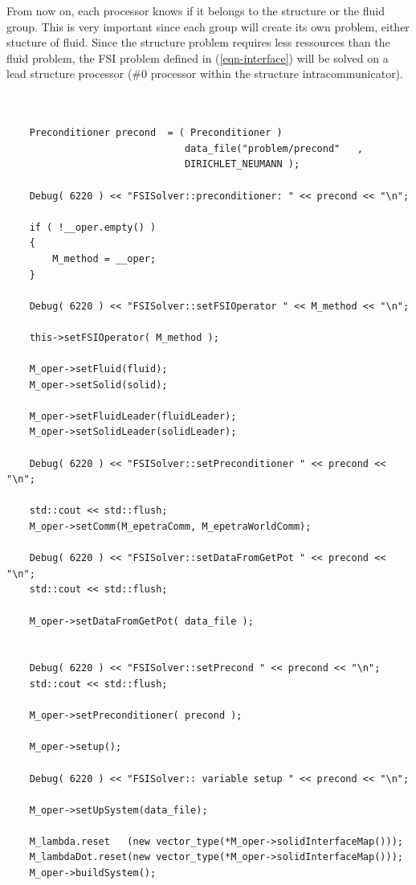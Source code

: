 From now on, each processor knows if it belongs to the structure or the fluid group. This is
very important since each group will create its own problem, either stucture of fluid.
Since the structure problem requires less ressources than the fluid problem, the FSI problem defined in (\ref{eqn-interface})
will be solved on a lead structure processor (\#0 processor within the structure intracommunicator).

\begin{verbatim}


    Preconditioner precond  = ( Preconditioner )
                               data_file("problem/precond"   ,
                               DIRICHLET_NEUMANN );

    Debug( 6220 ) << "FSISolver::preconditioner: " << precond << "\n";

    if ( !__oper.empty() )
    {
        M_method = __oper;
    }

    Debug( 6220 ) << "FSISolver::setFSIOperator " << M_method << "\n";

    this->setFSIOperator( M_method );

    M_oper->setFluid(fluid);
    M_oper->setSolid(solid);

    M_oper->setFluidLeader(fluidLeader);
    M_oper->setSolidLeader(solidLeader);

    Debug( 6220 ) << "FSISolver::setPreconditioner " << precond << "\n";

    std::cout << std::flush;
    M_oper->setComm(M_epetraComm, M_epetraWorldComm);

    Debug( 6220 ) << "FSISolver::setDataFromGetPot " << precond << "\n";
    std::cout << std::flush;

    M_oper->setDataFromGetPot( data_file );


    Debug( 6220 ) << "FSISolver::setPrecond " << precond << "\n";
    std::cout << std::flush;

    M_oper->setPreconditioner( precond );

    M_oper->setup();

    Debug( 6220 ) << "FSISolver:: variable setup " << precond << "\n";

    M_oper->setUpSystem(data_file);

    M_lambda.reset   (new vector_type(*M_oper->solidInterfaceMap()));
    M_lambdaDot.reset(new vector_type(*M_oper->solidInterfaceMap()));
    M_oper->buildSystem();

\end{verbatim}

